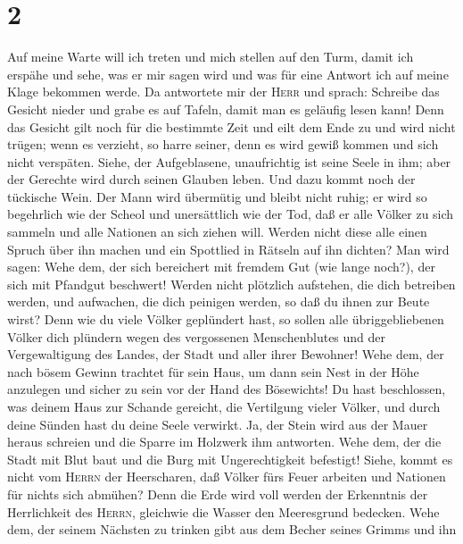 \hypertarget{section-1}{%
\section{2}\label{section-1}}

 Auf meine Warte will ich treten und mich stellen auf den
Turm, damit ich erspähe und sehe, was er mir sagen wird und was für eine
Antwort ich auf meine Klage bekommen werde.  Da antwortete
mir der \textsc{Herr} und sprach: Schreibe das Gesicht nieder und grabe
es auf Tafeln, damit man es geläufig lesen kann!  Denn das
Gesicht gilt noch für die bestimmte Zeit und eilt dem Ende zu und wird
nicht trügen; wenn es verzieht, so harre seiner, denn es wird gewiß
kommen und sich nicht verspäten.  Siehe, der Aufgeblasene,
unaufrichtig ist seine Seele in ihm; aber der Gerechte wird durch seinen
Glauben leben.  Und dazu kommt noch der tückische Wein.
Der Mann wird übermütig und bleibt nicht ruhig; er wird so begehrlich
wie der Scheol und unersättlich wie der Tod, daß er alle Völker zu sich
sammeln und alle Nationen an sich ziehen will.  Werden
nicht diese alle einen Spruch über ihn machen und ein Spottlied in
Rätseln auf ihn dichten? Man wird sagen: Wehe dem, der sich bereichert
mit fremdem Gut (wie lange noch?), der sich mit Pfandgut beschwert!
 Werden nicht plötzlich aufstehen, die dich betreiben
werden, und aufwachen, die dich peinigen werden, so daß du ihnen zur
Beute wirst?  Denn wie du viele Völker geplündert hast, so
sollen alle übriggebliebenen Völker dich plündern wegen des vergossenen
Menschenblutes und der Vergewaltigung des Landes, der Stadt und aller
ihrer Bewohner!  Wehe dem, der nach bösem Gewinn trachtet
für sein Haus, um dann sein Nest in der Höhe anzulegen und sicher zu
sein vor der Hand des Bösewichts!  Du hast beschlossen,
was deinem Haus zur Schande gereicht, die Vertilgung vieler Völker, und
durch deine Sünden hast du deine Seele verwirkt.  Ja, der
Stein wird aus der Mauer heraus schreien und die Sparre im Holzwerk ihm
antworten.  Wehe dem, der die Stadt mit Blut baut und die
Burg mit Ungerechtigkeit befestigt!  Siehe, kommt es
nicht vom \textsc{Herrn} der Heerscharen, daß Völker fürs Feuer arbeiten
und Nationen für nichts sich abmühen?  Denn die Erde wird
voll werden der Erkenntnis der Herrlichkeit des \textsc{Herrn},
gleichwie die Wasser den Meeresgrund bedecken.  Wehe dem,
der seinem Nächsten zu trinken gibt aus dem Becher seines Grimms und ihn

